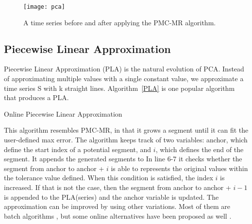 \begin{figure}[!htbp]
\begin{center}
\texttt{[image: pca]}
\caption[pca]{A time series before and after applying the PMC-MR algorithm.}
\label{pca}
\end{center}
\end{figure}

\subsection{Piecewise Linear Approximation}
Piecewise Linear Approximation (PLA) is the natural evolution of PCA. Instead of
approximating multiple values with a single constant value, we approximate a time series
S with k straight lines. Algorithm~\ref{PLA} is one popular algorithm that produces a PLA.

\begin{algorithm}
\caption{Online Piecewise Linear Approximation \cite{Lazaridis2003Capturing}}\label{PLA}
\begin{algorithmic}[1]
    \EndWhile
\EndWhile
{}
\EndProcedure
\end{algorithmic}
\end{algorithm}

This algorithm resembles PMC-MR, in that it grows a segment until it can fit the user-defined
max error. The algorithm keeps track of two variables: anchor, which define the start index
of a potential segment, and $i$, which defines the end of the segment. It appends the generated
segments to  In line 6-7 it checks
whether the segment from anchor to anchor + $i$ is able to represents the original values
within the tolerance value defined.
When this condition is satisfied, the index $i$ is increased. If that is not the case,
then the segment from anchor to anchor + $i - 1$ is appended to the PLA(series)
and the anchor variable is updated. The approximation can be improved by using other variations.
Most of them are batch algorithms \cite{Douglas1973Algorithms}\cite{Park1999Fast}
\cite{Keogh1998An}, but some online alternatives have been
proposed as well \cite{Keogh2001An}.

